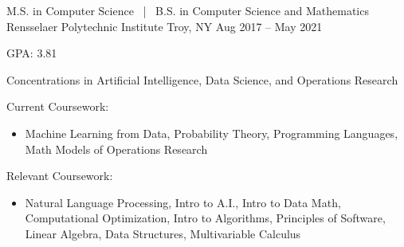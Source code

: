 


\begin{cventries}

  \cventry
  {M.S. in Computer Science \, | \, B.S. in Computer Science and Mathematics}
  {Rensselaer Polytechnic Institute}
  {Troy, NY}
  {Aug 2017 -- May 2021}
  {
    \begin{cvitems}
      \item GPA: 3.81
      \item Concentrations in Artificial Intelligence, Data Science, and Operations Research
      \item Current Coursework:
      \begin{itemize}
        \item Machine Learning from Data, Probability Theory, Programming Languages, Math Models of Operations Research
      \end{itemize}
      \item Relevant Coursework:
      \begin{itemize}
        \item Natural Language Processing, Intro to A.I., Intro to Data Math, Computational Optimization, Intro to Algorithms, \newline Principles of Software, Linear Algebra, Data Structures, Multivariable Calculus
      \end{itemize}
    \end{cvitems}
  }


\end{cventries}
